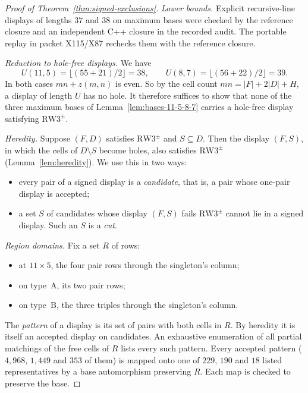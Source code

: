\documentclass[11pt,a4paper]{article}
\theoremstyle{definition}
\newcommand{\SG}{\mathrm{RW3}^{\pm}}
\begin{document}
\begin{proof}[Proof of Theorem~\ref{thm:signed-exclusions}]
\emph{Lower bounds.} Explicit recursive-line displays of lengths $37$ and
$38$ on maximum bases were checked by the reference closure and an
independent C++ closure in the recorded audit. The portable replay in
packet X115/X87 rechecks them with the reference closure.

\emph{Reduction to hole-free displays.} We have
\[
U(11,5)=\lfloor(55+21)/2\rfloor=38,\qquad U(8,7)=\lfloor(56+22)/2\rfloor=39 .
\]
In both cases $mn+z(m,n)$ is even. So by the cell count
$mn=|F|+2|D|+H$, a display of length $U$ has no hole. It therefore
suffices to show that none of the three maximum bases of
Lemma~\ref{lem:bases-11-5-8-7} carries a hole-free display satisfying
$\SG$.

\emph{Heredity.} Suppose $(F,D)$ satisfies $\SG$ and $S\subseteq D$. Then
the display $(F,S)$, in which the cells of $D\setminus S$ become holes,
also satisfies $\SG$ (Lemma~\ref{lem:heredity}). We use this in two
ways:
\begin{itemize}
\item every pair of a signed display is a \emph{candidate}, that is, a
      pair whose one-pair display is accepted;
\item a set $S$ of candidates whose display $(F,S)$ fails $\SG$ cannot lie
      in a signed display. Such an $S$ is a \emph{cut}.
\end{itemize}

\emph{Region domains.} Fix a set $R$ of rows:
\begin{itemize}
\item at $11\times5$, the four pair rows through the singleton's column;
\item on type~A, its two pair rows;
\item on type~B, the three triples through the singleton's column.
\end{itemize}
The \emph{pattern} of a display is its set of pairs with both cells in
$R$. By heredity it is itself an accepted display on candidates. An
exhaustive enumeration of all partial matchings of the free cells of $R$
lists every such pattern. Every accepted pattern ($4{,}968$, $1{,}449$
and $353$ of them) is mapped onto one of $229$, $190$ and $18$ listed
representatives by a base automorphism preserving $R$. Each map is checked
to preserve the base.


\end{proof}
\end{document}
